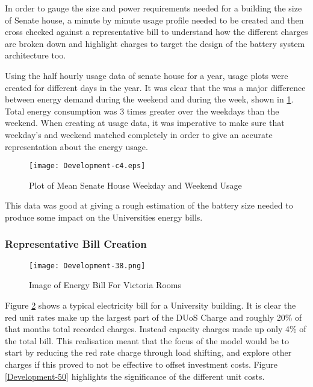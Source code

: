 In order to gauge the size and power requirements needed for a building
the size of Senate house, a minute by minute usage profile needed to be
created and then cross checked against a representative bill to
understand how the different charges are broken down and highlight
charges to target the design of the battery system architecture too.

Using the half hourly usage data of senate house for a year, usage plots
were created for different days in the year. It was clear that the was a
major difference between energy demand during the weekend and during the
week, shown in \ref{Development-c4}. Total energy consumption was 3
times greater over the weekdays than the weekend. When creating at usage
data, it was imperative to make sure that weekday's and weekend matched
completely in order to give an accurate representation about the energy
usage.\\

\begin{figure}[H]
 \centering
 \texttt{[image: Development-c4.eps]}
 \caption{Plot of Mean Senate House Weekday and Weekend Usage}
 \label{Development-c4}
 \end{figure}

This data was good at giving a rough estimation of the battery size
needed to produce some impact on the Universities energy bills.

\subsubsection{Representative Bill
Creation}\label{representative-bill-creation}

\begin{figure}[H]
 \centering
 \texttt{[image: Development-38.png]}
 \caption{Image of Energy Bill For Victoria Rooms}
 \label{Development-38}
 \end{figure}

Figure \ref{Development-38} shows a typical electricity bill for a
University building. It is clear the red unit rates make up the largest
part of the DUoS Charge and roughly 20\% of that months total recorded
charges. Instead capacity charges made up only 4\% of the total bill.
This realisation meant that the focus of the model would be to start by
reducing the red rate charge through load shifting, and explore other
charges if this proved to not be effective to offset investment costs.
Figure \ref{Development-50} highlights the significance of the different
unit costs.

